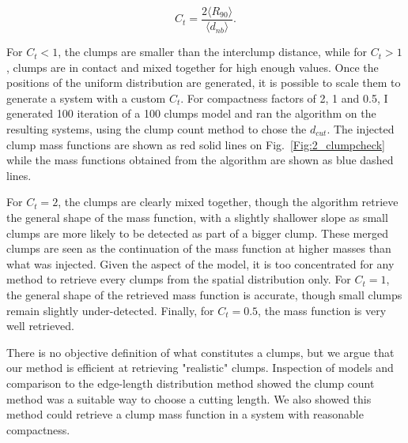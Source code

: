 \begin{equation}
C_t = \frac{ 2 \langle R_{90}\rangle}{\langle d_{nb}\rangle }.
\end{equation}

For $C_t <1$, the clumps are smaller than the interclump distance, while for $C_t > 1$, clumps are in contact and mixed together for high enough values. Once the positions of the uniform distribution are generated, it is possible to scale them to generate a system with a custom $C_t$. For compactness factors of 2, 1 and 0.5, I generated 100 iteration of a 100 clumps model and ran the algorithm on the resulting systems, using the clump count method to chose the $d_{cut}$. The injected clump mass functions are shown as red solid lines on Fig.~\ref{Fig:2_clumpcheck} while the mass functions obtained from the algorithm are shown as blue dashed lines.

For $C_t = 2$, the clumps are clearly mixed together, though the algorithm retrieve the general shape of the mass function, with a slightly shallower slope as small clumps are more likely to be detected as part of a bigger clump. These merged clumps are seen as the continuation of the mass function at higher masses than what was injected. Given the aspect of the model, it is too concentrated for any method to retrieve every clumps from the spatial distribution only. For $C_t = 1$, the general shape of the retrieved mass function is accurate, though small clumps remain slightly under-detected. Finally, for $C_t = 0.5$, the mass function is very well retrieved.

There is no objective definition of what constitutes a clumps, but we argue that our method is efficient at retrieving "realistic" clumps. Inspection of \HubLem models and comparison to the edge-length distribution method showed the clump count method was a suitable way to choose a cutting length. We also showed this method could retrieve a clump mass function in a system with reasonable compactness.


